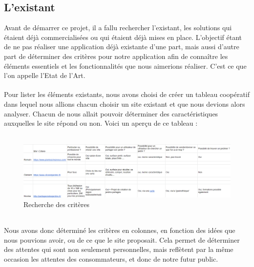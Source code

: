 \documentclass{tnreport}
\begin{document}
\subsection*{L'existant}
\begin{sloppypar}
    Avant de démarrer ce projet, il a fallu rechercher l'existant, les solutions qui étaient déjà commercialisées ou qui étaient déjà mises en place. L'objectif étant de ne pas réaliser une application déjà existante d'une part, mais aussi d'autre part de déterminer des critères pour notre application afin de connaître les éléments essentiels et les fonctionnalités que nous aimerions réaliser. C'est ce que l'on appelle l'Etat de l'Art.\\
    \\
    Pour lister les éléments existants, nous avons choisi de créer un tableau coopératif dans lequel nous allions chacun choisir un site existant et que nous devions alors analyser. Chacun de nous allait pouvoir déterminer des caractéristiques auxquelles le site répond ou non. Voici un aperçu de ce tableau : \\
    \\
    \begin{figure}[h]
        \centering
        \includegraphics[scale=0.48]{Image/tableauEtatDeLArt.png}
        \caption{Recherche des critères}
        \label{fig:etat de l'Art}
    \end{figure}
    \\
    Nous avons donc déterminé les critères en colonnes, en fonction des idées que nous pouvions avoir, ou de ce que le site proposait. Cela permet de déterminer des attentes qui sont non seulement personnelles, mais reflètent par la même occasion les attentes des consommateurs, et donc de notre futur public.
\end{sloppypar}
\end{document}
